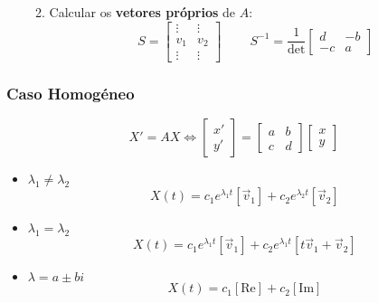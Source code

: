 \documentclass[11pt, a4paper]{article}
\begin{document}
\begin{itemize}
\begin{enumerate}
\begin{enumerate}
\begin{equation*}
            \end{equation*}
        \end{enumerate}
        \item Calcular os \textbf{vetores próprios} de $A$:
        \begin{equation*}
            S = \left[\begin{matrix}
                \vdots & \vdots \\
                v_1 & v_2 \\
                \vdots & \vdots
            \end{matrix}\right]
            \ \ \ \ \ \ \ \ \ \
            S^{-1} = \frac{1}{\text{det}} \left[\begin{matrix}
                d & -b \\
                -c & a 
            \end{matrix}\right]
        \end{equation*}
    \end{enumerate}
\end{itemize}

\subsubsection{Caso Homogéneo}

\begin{equation*}
    X' = AX \Leftrightarrow
    \left[ \begin{matrix} x' \\ y' \end{matrix} \right] = 
    \left[ \begin{matrix} a & b \\ c & d \end{matrix} \right]
    \left[ \begin{matrix} x \\ y \end{matrix} \right]
\end{equation*}

\begin{itemize}
    \item $\lambda_1 \ne \lambda_2$
        \begin{equation*}
            X(t) = c_1 e^{\lambda_1 t}[\vec{v}_1] + 
                c_2 e^{\lambda_2 t}[\vec{v}_2]
        \end{equation*}
    \item $\lambda_1 = \lambda_2$
        \begin{equation*}
            X(t) = c_1 e^{\lambda_1 t}[\vec{v}_1] + 
                c_2 e^{\lambda_1 t}[t\vec{v}_1 + \vec{v}_2]
        \end{equation*}
    \item $\lambda = a \pm bi$
        \begin{equation*}
            X(t) = c_1 [\text{Re}] + c_2 [\text{Im}]
        \end{equation*}
\end{itemize}
\end{document}
